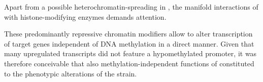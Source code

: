 Apart from a possible heterochromatin-spreading in \dnmtchip, the manifold interactions of  with histone-modifying enzymes demands attention.

These predominantly repressive chromatin modifiers allow  to alter transcription of target genes independent of DNA methylation in a direct manner\cite{Espada2011,Clements2012}.  Given that many upregulated transcripts did not feature a hypomethylated promoter, it was therefore conceivable that also methylation-independent functions of   constituted to the phenotypic alterations of the \dnmtchip strain.    